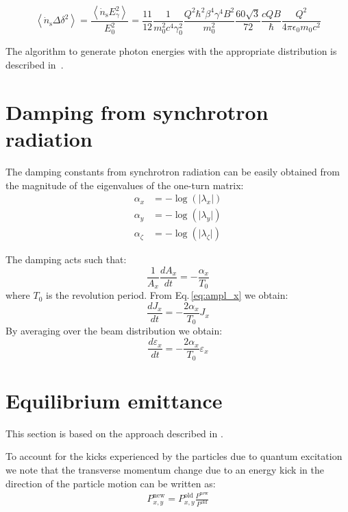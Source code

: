 \begin{equation}
\left\langle \dot{n}_{\mathrm{s}} \Delta \delta ^2\right\rangle
=
\frac{\left\langle \dot{n}_{\mathrm{s}} {E_\gamma^2}
 \right\rangle} {E_0^2}
=
\frac{11}{12}
\frac{1}{m_0^2 c^4 \gamma_0^2 }
\frac{ Q^2\hbar^2\beta^4\gamma^4 B^2 }{ m_0^2}
\frac{60 \sqrt{3}}{72}
\frac{ c Q B}{\hbar}
\frac{Q^2}{4 \pi \epsilon_0 m_0 c^2}
\end{equation}

The algorithm to generate photon energies with the appropriate distribution is described in~\cite{helmut_synrad_90}.



\section{Damping from synchrotron radiation}
\label{section:sr_damping_times}

The damping constants from synchrotron radiation can be easily obtained from the magnitude of the eigenvalues of the one-turn matrix:
\begin{align}
\alpha_x &= -\log( \lvert \lambda_x \rvert)\\
\alpha_y &= -\log( \lvert \lambda_y \rvert)\\
\alpha_\zeta &= -\log( \lvert \lambda_\zeta \rvert)
\end{align}

The damping acts such that:
\begin{equation}
\frac{1}{A_x} \frac{dA_x}{dt} = - \frac{\alpha_x}{T_0}
\end{equation}
where $T_0$ is the revolution period.
From Eq.\,\ref{eq:ampl_x} we obtain:
\begin{equation}
\frac{dJ_x}{dt} = - \frac{2\alpha_x}{T_0}  J_x
\end{equation}
By averaging over the beam distribution we obtain:
\begin{equation}
\frac{d\varepsilon_x}{dt} = - \frac{2\alpha_x}{T_0}  \varepsilon_x
\label{eq:grate_rad_damp}
\end{equation}

\section{Equilibrium emittance}

This section is based on the approach described in \cite{chao_eq_emit}.

To account for the kicks experienced by the particles due to quantum excitation we note that the transverse momentum change due to an energy kick in the direction of the particle motion can be written as:
\begin{align}
P_{x,y}^\text{new} = P_{x,y}^\text{old}  \frac{P^\text{new}}{P^\text{old}}
\end{align}

